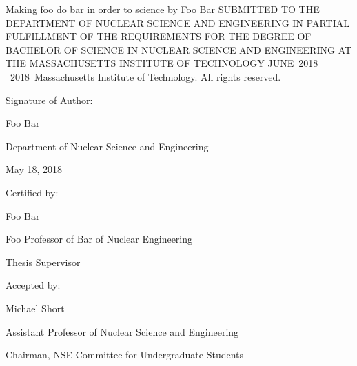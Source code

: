 \documentclass[twoside]{article}
\newcommand\blankpage{ %
    \null
    \thispagestyle{empty}
    \newpage}
\newcommand{\thesis}{Making foo do bar in order to science}
\newcommand{\me}{Foo Bar}
\newcommand{\gradMonth}{JUNE}%
\newcommand{\gradYear}{2018}
\newcommand{\signDate}{May 18, 2018}
\newcommand{\advisorName}{Foo Bar}
\newcommand{\advisorTitle}{Foo Professor of Bar of Nuclear Engineering}
\newcommand{\ugChairName}{Michael Short}
\newcommand{\ugChairTitle}{Assistant Professor of Nuclear Science and Engineering}
\newcommand{\ugChairChair}{Chairman, NSE Committee for Undergraduate Students}
\newcommand{\copyStatement}{{\textcopyright \ \gradYear \ Massachusetts Institute of Technology. All rights reserved.}}
\begin{document}
\setcounter{page}{1} %
\begin{titlepage}
    \begin{center}
    {\Large{\thesis}}
    \vfill
    {by}
    \vfill
    {\me}
    \vfill
    {SUBMITTED TO THE DEPARTMENT OF NUCLEAR SCIENCE AND ENGINEERING IN PARTIAL FULFILLMENT OF THE REQUIREMENTS FOR THE DEGREE OF}
    \vfill
    {BACHELOR OF SCIENCE IN NUCLEAR SCIENCE AND ENGINEERING}
    \vfill
    {AT THE}
    \vfill
    {MASSACHUSETTS INSTITUTE OF TECHNOLOGY}
    \vfill
    {\gradMonth\ \gradYear}
    \vfill
	\copyStatement
    \end{center}
    
    
    \begin{flushleft}
    {Signature of Author:\hrulefill}
    \end{flushleft}
    
    \begin{flushright}
    {\me }
    
    {Department of Nuclear Science and Engineering}
    
    {\signDate }
    \end{flushright}
    \vfill

    \begin{flushleft}
    {Certified by:\hrulefill}
    \end{flushleft}
    
    \begin{flushright}
    {\advisorName}
    
    {\advisorTitle}
    
    {Thesis Supervisor}
    
    \end{flushright}
    \vfill

\begin{flushleft}
    {Accepted by:\hrulefill}
    \end{flushleft}
    
    \begin{flushright}
	{\ugChairName}
	
	{\ugChairTitle}
	
	{\ugChairChair}
    \end{flushright}
    
\end{titlepage}
\blankpage
\end{document}
